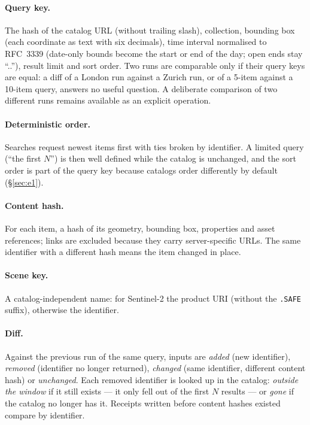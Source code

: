 \documentclass[11pt,a4paper]{article}
\begin{document}
\paragraph{Query key.} The hash of the catalog URL (without trailing slash), collection, bounding box (each coordinate as text with six decimals), time interval normalised to RFC~3339 (date-only bounds become the start or end of the day; open ends stay ``..''), result limit and sort order. Two runs are comparable only if their query keys are equal: a diff of a London run against a Zurich run, or of a 5-item against a 10-item query, answers no useful question. A deliberate comparison of two different runs remains available as an explicit operation.

\paragraph{Deterministic order.} Searches request newest items first with ties broken by identifier. A limited query (``the first $N$'') is then well defined while the catalog is unchanged, and the sort order is part of the query key because catalogs order differently by default (\S\ref{sec:e1}).

\paragraph{Content hash.} For each item, a hash of its geometry, bounding box, properties and asset references; links are excluded because they carry server-specific URLs. The same identifier with a different hash means the item changed in place.

\paragraph{Scene key.} A catalog-independent name: for Sentinel-2 the product URI (without the \texttt{.SAFE} suffix), otherwise the identifier.

\paragraph{Diff.} Against the previous run of the same query, inputs are \emph{added} (new identifier), \emph{removed} (identifier no longer returned), \emph{changed} (same identifier, different content hash) or \emph{unchanged}. Each removed identifier is looked up in the catalog: \emph{outside the window} if it still exists --- it only fell out of the first $N$ results --- or \emph{gone} if the catalog no longer has it. Receipts written before content hashes existed compare by identifier.
\end{document}
